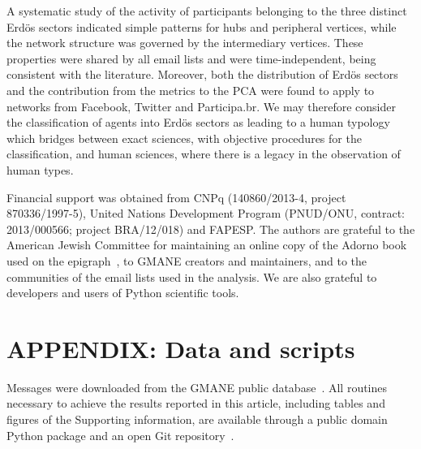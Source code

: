 \documentclass[%
	aip,
	jmp,%
	amsmath,amssymb,
	reprint,%
]{revtex4-1}
\begin{document}
A systematic study of the activity of participants belonging to the three distinct Erd\"os sectors indicated simple patterns for hubs and peripheral vertices, while the network structure was governed by the intermediary vertices. These properties were shared by all email lists and were time-independent, being consistent with the literature. Moreover, both the distribution of Erd\"os sectors and the contribution from the metrics to the PCA were found to apply to networks from Facebook, Twitter and Participa.br. We may therefore consider the classification of agents into Erd\"os sectors as leading to a human typology which bridges between exact sciences, with objective procedures for the classification, and human sciences, where there is a legacy in the observation of human types. 


\begin{acknowledgments}
	Financial support was obtained from CNPq (140860/2013-4,
	project 870336/1997-5), United Nations Development Program (PNUD/ONU, contract: 2013/000566; project BRA/12/018) and FAPESP. The authors are grateful to the American Jewish Committee for maintaining an online copy of the Adorno book used on the epigraph~\cite{adorno}, to GMANE creators and maintainers, and to the communities of the email lists used in the analysis. We are also grateful to developers and users of Python scientific tools.
\end{acknowledgments}


\appendix
\section*{APPENDIX: Data and scripts}\label{scripts}
Messages were downloaded from the GMANE public database~\cite{GMANEwikipedia}.
All routines necessary to achieve the results reported in this article, including tables and figures of the Supporting information, are available through a public domain Python package and an open Git repository~\cite{gmanePack}.

\end{document}
